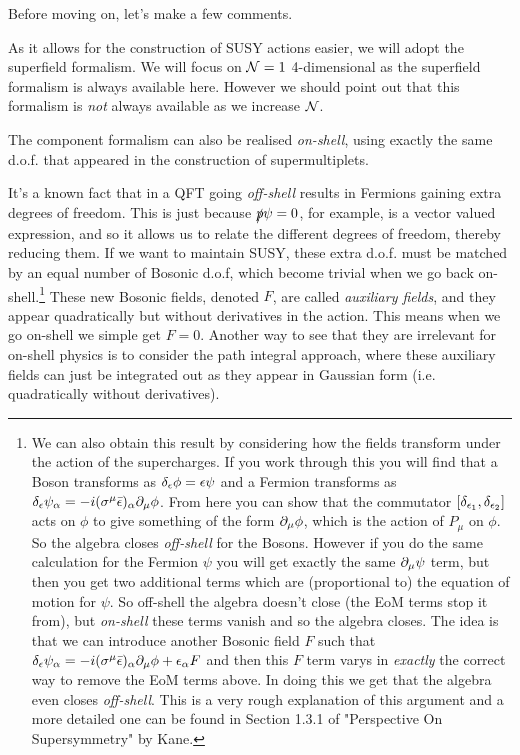 Before moving on, let's make a few comments.
\ben[label=(\roman*)] 
    \item As it allows for the construction of SUSY actions easier, we will adopt the superfield formalism. We will focus on $\mathcal{N}=1$ 4-dimensional as the superfield formalism is always available here. However we should point out that this formalism is \textit{not} always available as we increase $\mathcal{N}$. 
    \item The component formalism can also be realised \textit{on-shell}, using exactly the same d.o.f. that appeared in the construction of supermultiplets. 
    \item It's a known fact that in a QFT going \textit{off-shell} results in Fermions gaining extra degrees of freedom. This is just because $\slashed{p}\psi=0$, for example, is a vector valued expression, and so it allows us to relate the different degrees of freedom, thereby reducing them. If we want to maintain SUSY, these extra d.o.f. must be matched by an equal number of Bosonic d.o.f, which become trivial when we go back on-shell.\footnote{We can also obtain this result by considering how the fields transform under the action of the supercharges. If you work through this you will find that a Boson transforms as $\delta_{\epsilon}\phi = \epsilon\psi$ and a Fermion transforms as $\delta_{\epsilon}\psi_{\alpha} = -i(\sigma^{\mu}\bar{\epsilon})_{\alpha} \partial_{\mu}\phi$. From here you can show that the commutator $[\delta_{\epsilon_1},\delta_{\epsilon_2}]$ acts on $\phi$ to give something of the form $\partial_{\mu}\phi$, which is the action of $P_{\mu}$ on $\phi$. So the algebra closes \textit{off-shell} for the Bosons. However if you do the same calculation for the Fermion $\psi$ you will get exactly the same $\partial_{\mu}\psi$ term, but then you get two additional terms which are (proportional to) the equation of motion for $\psi$. So off-shell the algebra doesn't close (the EoM terms stop it from), but \textit{on-shell} these terms vanish and so the algebra closes. The idea is that we can introduce another Bosonic field $F$ such that $\delta_{\epsilon}\psi_{\alpha} = -i(\sigma^{\mu}\bar{\epsilon})_{\alpha} \partial_{\mu}\phi + \epsilon_{\alpha} F$ and then this $F$ term varys in \textit{exactly} the correct way to remove the EoM terms above. In doing this we get that the algebra even closes \textit{off-shell}. This is a very rough explanation of this argument and a more detailed one can be found in Section 1.3.1 of "Perspective On Supersymmetry" by Kane.} These new Bosonic fields, denoted $F$, are called \textit{auxiliary fields}, and they appear quadratically but without derivatives in the action. This means when we go on-shell we simple get $F=0$. Another way to see that they are irrelevant for on-shell physics is to consider the path integral approach, where these auxiliary fields can just be integrated out as they appear in Gaussian form (i.e. quadratically without derivatives).
\een 


